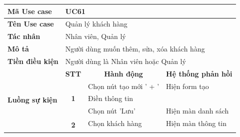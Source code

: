 \documentclass[../DoAn.tex]{subfiles}
\begin{document}
\begin{table}[H]
    \begin{tabular}{|l|c|l|l|}
        \hline
        \textbf{Mã Use case}                    & \multicolumn{3}{l|}{UC61}                                                                                                                                    \\ \hline
        \textbf{Tên Use case}                   & \multicolumn{3}{l|}{Quản lý khách hàng}                                                                                                                      \\ \hline
        \textbf{Tác nhân}                       & \multicolumn{3}{l|}{Nhân viên, Quản lý}                                                                                                                      \\ \hline
        \textbf{Mô tả}                          & \multicolumn{3}{l|}{Người dùng muốn thêm, sửa, xóa khách hàng}                                                                                               \\ \hline
        \textbf{Tiền điều kiện}                 & \multicolumn{3}{l|}{Người dùng là Nhân viên hoặc Quản lý}                                                                                                    \\ \hline
        \multirow{9}{*}{\textbf{Luồng sự kiện}} & \multicolumn{1}{c|}{\textbf{STT}}                              & \multicolumn{1}{c|}{\textbf{Hành động}}   & \multicolumn{1}{c|}{\textbf{Hệ thống phản hồi}} \\ \cline{2-4}
                                                & \multirow{3}{*}{\textbf{1}}                                    & Chọn nút tạo mới ' + '                    & Hiện form tạo                                   \\ \cline{3-4}
                                                &                                                                & Điền thông tin                            &                                                 \\
                                                &                                                                & Chọn nút 'Lưu'                            & Hiện màn danh sách                              \\ \cline{2-4}
                                                & \multirow{4}{*}{\textbf{2}}                                    & Chọn khách hàng                           & Hiện màn thông tin                              \\ \cline{3-4}

\end{tabular}
\end{table}
\end{document}
